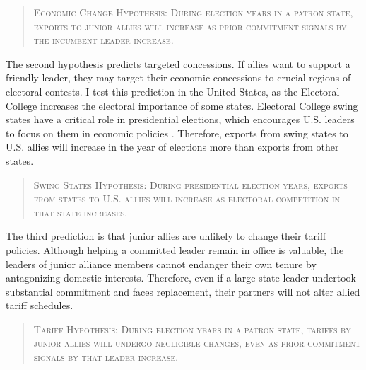 \documentclass[12pt]{article}
\begin{document}
\begin{quote}
\textsc{Economic Change Hypothesis: During election years in a patron state, exports to junior allies will increase as prior commitment signals by the incumbent leader increase.}
\end{quote}



The second hypothesis predicts targeted concessions.
If allies want to support a friendly leader, they may target their economic concessions to crucial regions of electoral contests. 
I test this prediction in the United States, as the Electoral College increases the electoral importance of some states.
Electoral College swing states have a critical role in presidential elections, which encourages U.S. leaders to focus on them in economic policies \citep{KrinerReeves2015, Conconietal2017}.
Therefore, exports from swing states to U.S. allies will increase in the year of elections more than exports from other states.


\begin{quote}
\textsc{Swing States Hypothesis: During presidential election years, exports from states to U.S. allies will increase as electoral competition in that state increases.}
\end{quote}

%
%
%


The third prediction is that junior allies are unlikely to change their tariff policies. 
Although helping a committed leader remain in office is valuable, the leaders of junior alliance members cannot endanger their own tenure by antagonizing domestic interests.
Therefore, even if a large state leader undertook substantial commitment and faces replacement, their partners will not alter allied tariff schedules. 


\begin{quote}
\textsc{Tariff Hypothesis: During election years in a patron state, tariffs by junior allies will undergo negligible changes, even as prior commitment signals by that leader increase.}
\end{quote}
\end{document}
